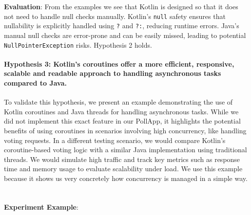 \noindent \textbf{Evaluation}: From the examples we see that Kotlin is designed so that it does not need to handle null checks manually. Kotlin’s \texttt{null} safety ensures that nullability is explicitly handled using \texttt{?} and \texttt{?:}, reducing runtime errors. Java’s manual null checks are error-prone and can be easily missed, leading to potential \texttt{NullPointerException} risks. Hypothesis 2 holds.
\\
\\
\textbf{Hypothesis 3: Kotlin's coroutines offer a more efficient, responsive, scalable and readable approach to handling asynchronous tasks compared to Java.}
\\
\\ 
To validate this hypothesis, we present an example demonstrating the use of Kotlin coroutines and Java threads for handling asynchronous tasks. While we did not implement this exact feature in our PollApp, it highlights the potential benefits of using coroutines in scenarios involving high concurrency, like handling voting requests. In a different testing scenario, we would compare Kotlin’s coroutine-based voting logic with a similar Java implementation using traditional threads. We would simulate high traffic and track key metrics such as response time and memory usage to evaluate scalability under load. We use this example because it shows us very concretely how concurrency is managed in a simple way. 
\\
\\
\\
\textbf{Experiment Example}:

